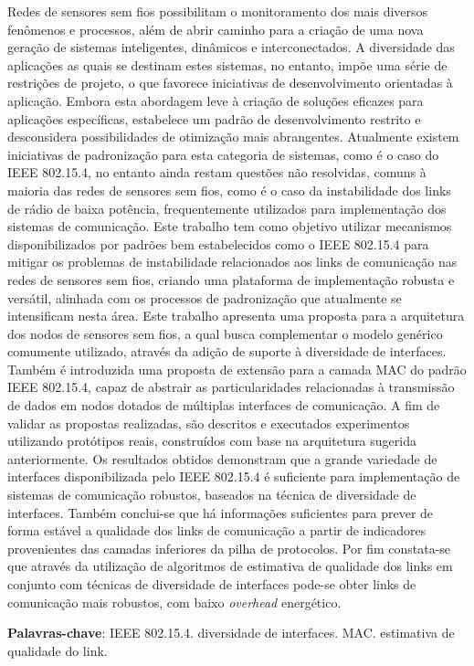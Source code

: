 \documentclass[
	12pt,				%
	openright,			%
	oneside,
	a4paper,			%
	english,			%
	french,				%
	spanish,			%
	brazil				%
	]{abntex2}
\begin{document}
\setlength{\absparsep}{18pt} %
\begin{resumo}
 
 Redes de sensores sem fios possibilitam o monitoramento dos mais diversos fenômenos e processos, além de abrir caminho para a criação de uma nova geração de sistemas inteligentes, dinâmicos e interconectados. A diversidade das aplicações as quais se destinam estes sistemas, no entanto, impõe uma série de restrições de projeto, o que favorece iniciativas de desenvolvimento orientadas à aplicação. Embora esta abordagem leve à criação de soluções eficazes para aplicações específicas, estabelece um padrão de desenvolvimento restrito e desconsidera possibilidades de otimização mais abrangentes. Atualmente existem iniciativas de padronização para esta categoria de sistemas, como é o caso do IEEE 802.15.4, no entanto ainda restam questões não resolvidas, comuns à maioria das redes de sensores sem fios, como é o caso da instabilidade dos links de rádio de baixa potência, frequentemente utilizados para implementação dos sistemas de comunicação. Este trabalho tem como objetivo utilizar mecanismos disponibilizados por padrões bem estabelecidos como o IEEE 802.15.4 para mitigar os problemas de instabilidade relacionados aos links de comunicação nas redes de sensores sem fios, criando uma plataforma de implementação robusta e versátil, alinhada com os processos de padronização que atualmente se intensificam nesta área. Este trabalho apresenta uma proposta para a arquitetura dos nodos de sensores sem fios, a qual busca complementar o modelo genérico comumente utilizado, através da adição de suporte à diversidade de interfaces. Também é introduzida uma proposta de extensão para a camada MAC do padrão IEEE 802.15.4, capaz de abstrair as particularidades relacionadas à transmissão de dados em nodos dotados de múltiplas interfaces de comunicação. A fim de validar as propostas realizadas, são descritos e executados experimentos utilizando protótipos reais, construídos com base na arquitetura sugerida anteriormente. Os resultados obtidos demonstram que a grande variedade de interfaces disponibilizada pelo IEEE 802.15.4 é suficiente para implementação de sistemas de comunicação robustos, baseados na técnica de diversidade de interfaces. Também conclui-se que há informações suficientes para prever de forma estável a qualidade dos links de comunicação a partir de indicadores provenientes das camadas inferiores da pilha de protocolos. Por fim constata-se que através da utilização de algoritmos de estimativa de qualidade dos links em conjunto com técnicas de diversidade de interfaces pode-se obter links de comunicação mais robustos, com baixo \textit{overhead} energético.
 
  

 \textbf{Palavras-chave}: IEEE 802.15.4. diversidade de interfaces. MAC. estimativa de qualidade do link.
\end{resumo}
\end{document}
